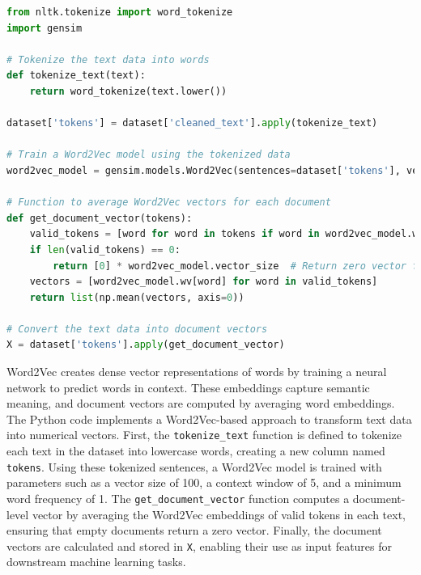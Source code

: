 \begin{tcolorbox}[colback=gray!5!white, colframe=gray!80!black, boxrule=0.5pt, title=Word2Vec]
\begin{lstlisting}[language=Python]
from nltk.tokenize import word_tokenize
import gensim

# Tokenize the text data into words
def tokenize_text(text):
    return word_tokenize(text.lower())

dataset['tokens'] = dataset['cleaned_text'].apply(tokenize_text)

# Train a Word2Vec model using the tokenized data
word2vec_model = gensim.models.Word2Vec(sentences=dataset['tokens'], vector_size=100, window=5, min_count=1, workers=4)

# Function to average Word2Vec vectors for each document
def get_document_vector(tokens):
    valid_tokens = [word for word in tokens if word in word2vec_model.wv]
    if len(valid_tokens) == 0:
        return [0] * word2vec_model.vector_size  # Return zero vector for empty documents
    vectors = [word2vec_model.wv[word] for word in valid_tokens]
    return list(np.mean(vectors, axis=0))

# Convert the text data into document vectors
X = dataset['tokens'].apply(get_document_vector)
\end{lstlisting}
\end{tcolorbox}

\noindent
Word2Vec creates dense vector representations of words by training a neural network to predict words in context. These embeddings capture semantic meaning, and document vectors are computed by averaging word embeddings. The Python code implements a Word2Vec-based approach to transform text data into numerical vectors. First, the \texttt{tokenize\_text} function is defined to tokenize each text in the dataset into lowercase words, creating a new column named \texttt{tokens}. Using these tokenized sentences, a Word2Vec model is trained with parameters such as a vector size of 100, a context window of 5, and a minimum word frequency of 1. The \texttt{get\_document\_vector} function computes a document-level vector by averaging the Word2Vec embeddings of valid tokens in each text, ensuring that empty documents return a zero vector. Finally, the document vectors are calculated and stored in \texttt{X}, enabling their use as input features for downstream machine learning tasks.

\vspace{1em}

